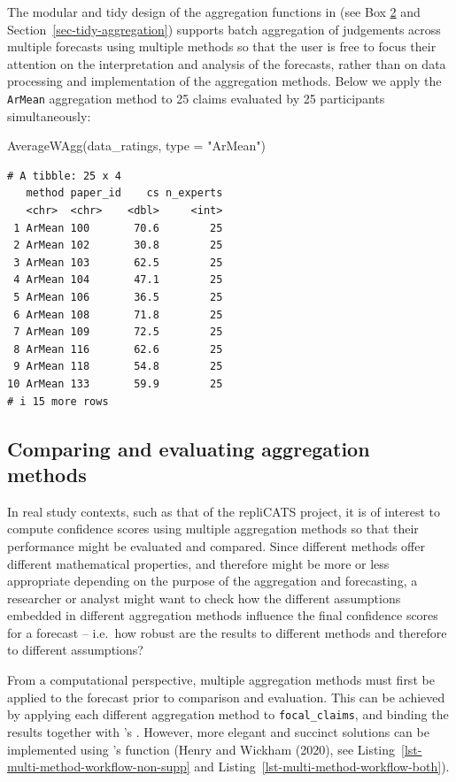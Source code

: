 \documentclass[
  11pt,
  a4paper,
]{article}
\newenvironment{Shaded}{\begin{snugshade}}{\end{snugshade}}
\newcommand{\AttributeTok}[1]{\textcolor[rgb]{0.40,0.45,0.13}{#1}}
\newcommand{\FunctionTok}[1]{\textcolor[rgb]{0.28,0.35,0.67}{#1}}
\newcommand{\NormalTok}[1]{\textcolor[rgb]{0.00,0.23,0.31}{#1}}
\newcommand{\StringTok}[1]{\textcolor[rgb]{0.13,0.47,0.30}{#1}}
\begin{document}
The modular and tidy design of the aggregation functions in
 (see Box \hyperref[aggWorkflow]{2} and
Section~\ref{sec-tidy-aggregation}) supports batch aggregation of
judgements across multiple forecasts using multiple methods so that the
user is free to focus their attention on the interpretation and analysis
of the forecasts, rather than on data processing and implementation of
the aggregation methods. Below we apply the \texttt{ArMean} aggregation
method to 25 claims evaluated by 25 participants simultaneously:

\begin{Shaded}
\begin{Highlighting}[]
\FunctionTok{AverageWAgg}\NormalTok{(data\_ratings, }\AttributeTok{type =} \StringTok{"ArMean"}\NormalTok{)}
\end{Highlighting}
\end{Shaded}

\begin{verbatim}
# A tibble: 25 x 4
   method paper_id    cs n_experts
   <chr>  <chr>    <dbl>     <int>
 1 ArMean 100       70.6        25
 2 ArMean 102       30.8        25
 3 ArMean 103       62.5        25
 4 ArMean 104       47.1        25
 5 ArMean 106       36.5        25
 6 ArMean 108       71.8        25
 7 ArMean 109       72.5        25
 8 ArMean 116       62.6        25
 9 ArMean 118       54.8        25
10 ArMean 133       59.9        25
# i 15 more rows
\end{verbatim}

\subsection{Comparing and evaluating aggregation
methods}\label{sec-evaluation}

In real study contexts, such as that of the repliCATS project, it is of
interest to compute confidence scores using multiple aggregation methods
so that their performance might be evaluated and compared. Since
different methods offer different mathematical properties, and therefore
might be more or less appropriate depending on the purpose of the
aggregation and forecasting, a researcher or analyst might want to check
how the different assumptions embedded in different aggregation methods
influence the final confidence scores for a forecast -- i.e.~how robust
are the results to different methods and therefore to different
assumptions?

From a computational perspective, multiple aggregation methods must
first be applied to the forecast prior to comparison and evaluation.
This can be achieved by applying each different aggregation method to
\texttt{focal\_claims}, and binding the results together with
's . However, more elegant and succinct
solutions can be implemented using 's  function
(Henry and Wickham (2020), see
Listing~\ref{lst-multi-method-workflow-non-supp} and
Listing~\ref{lst-multi-method-workflow-both}).
\end{document}
